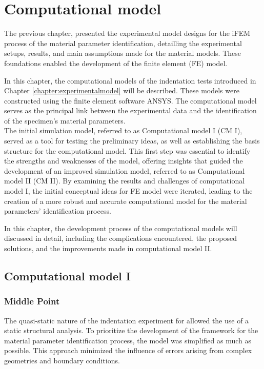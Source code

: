 
\chapter{Computational model} %
\label{chapter:computationalmodel} %

The previous chapter, presented the experimental model designs for the iFEM process of the material 
parameter identification, detailling the experimental setups, results, and main assumptions 
made for the material models. These foundations enabled the development of the finite element (FE) model.

In this chapter, the computational models of the indentation tests introduced in Chapter \ref{chapter:experimentalmodel} 
will be described. These models were constructed using the finite element software ANSYS. 
The computational model serves as the principal link between the experimental data and the identification of the 
specimen's material parameters.\\  

The initial simulation model, referred to as Computational model I (CM I), served as a tool 
for testing the preliminary ideas, as well as establishing the basis structure for 
the computational model. This first step was essential to identify the strengths and 
weaknesses of the model, offering insights that guided the development of an 
improved simulation model, referred to as Computational model II (CM II). By examining the 
results and challenges of computational model I, the initial conceptual ideas for FE model 
were iterated, leading to the creation of a more robust and accurate computational model
for the material parameters' identification process.

In this chapter, the development process of the computational models will discussed in detail, 
including the complications encountered, the proposed solutions, 
and the improvements made in computational model II.

\section{Computational model I}
\label{section:cpI}
\subsection{Middle Point}
\label{subsection:mpcpI}
The quasi-static nature of the indentation experiment for allowed the use of a static 
structural analysis. To prioritize the development of the framework for the material 
parameter identification process, the model was simplified as much as possible.
This approach minimized the influence of errors arising from complex geometries and boundary conditions.

